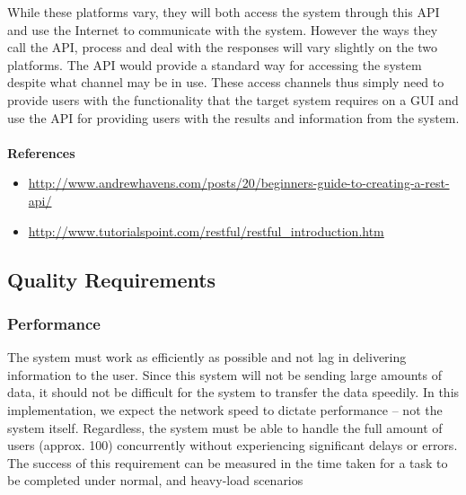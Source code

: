 \documentclass[a4paper,12pt]{article}
\begin{document}
While these platforms vary, they will both access the system through this API and use the Internet to communicate with the system. However the ways they call the API, process and deal with the responses will vary slightly on the two platforms. The API would provide a standard way for accessing the system despite what channel may be in use. These access channels thus simply need to provide users with the functionality that the target system requires on a GUI and use the API for providing users with the results and information from the system.
\\\\
\textbf{References}
\begin{itemize}
\item \url{http://www.andrewhavens.com/posts/20/beginners-guide-to-creating-a-rest-api/}
\item \url{http://www.tutorialspoint.com/restful/restful_introduction.htm}
\end{itemize}

\newpage
\subsection{Quality Requirements}

\subsubsection{Performance}
The system must work as efficiently as possible and not lag in delivering information to the user. Since this system will not be sending large amounts of data, it should not be difficult for the system to transfer the data speedily. In this implementation, we expect the network speed to dictate performance – not the system itself. Regardless, the system must be able to handle the full amount of users (approx. 100) concurrently without experiencing significant delays or errors. The success of this requirement can be measured in the time taken for a task to be completed under normal, and heavy-load scenarios
\end{document}
